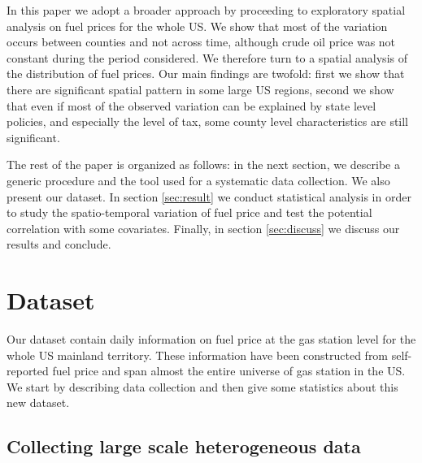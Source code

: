 \documentclass[3p,times,procedia]{elsarticle}
\begin{document}
In this paper we adopt a broader approach by proceeding to exploratory spatial analysis on fuel prices for the whole US. We show that most of the variation occurs between counties and not across time, although crude oil price was not constant during the period considered. We therefore turn to a spatial analysis of the distribution of fuel prices. Our main findings are twofold: first we show that there are significant spatial pattern in some large US regions, second we show that even if most of the observed variation can be explained by state level policies, and especially the level of tax, some county level characteristics are still significant.

The rest of the paper is organized as follows: in the next section, we describe a generic procedure and the tool used for a systematic data collection. We also present our dataset. In section \ref{sec:result} we conduct statistical analysis in order to study the spatio-temporal variation of fuel price and test the potential correlation with some covariates. Finally, in section \ref{sec:discuss} we discuss our results and conclude.

\section{Dataset} \label{sec:data}
Our dataset contain daily information on fuel price at the gas station level for the whole US mainland territory. These information have been constructed from self-reported fuel price and span almost the entire universe of gas station in the US. We start by describing data collection and then give some statistics about this new dataset.

\subsection{Collecting large scale heterogeneous data}
\end{document}
